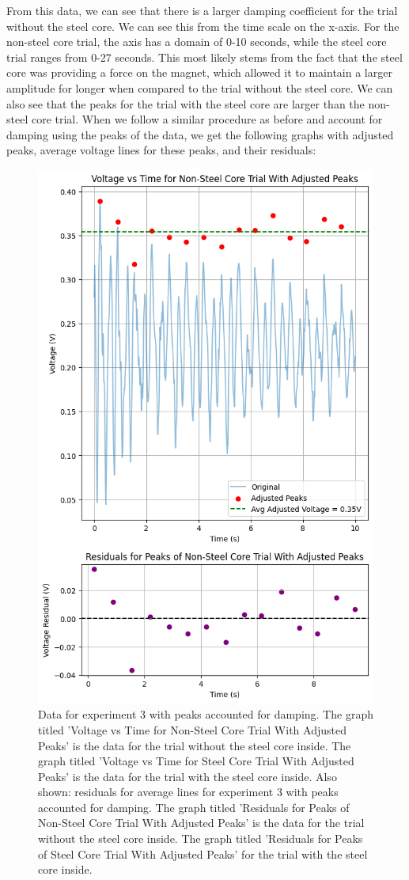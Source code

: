 \documentclass[11pt]{article}
\begin{document}
    From this data, we can see that there is a larger damping coefficient for the trial without the steel core. We can see this from the time scale on the x-axis. For the non-steel core trial, the axis has a domain of 0-10 seconds, while the steel core trial ranges from 0-27 seconds. This most likely stems from the fact that the steel core was providing a force on the magnet, which allowed it to maintain a larger amplitude for longer when compared to the trial without the steel core.
    We can also see that the peaks for the trial with the steel core are larger than the non-steel core trial. When we follow a similar procedure as before and account for damping using the peaks of the data, we get the following graphs with adjusted peaks, average voltage lines for these peaks, and their residuals:
    \begin{figure}[H]
        \centering
        \includegraphics[width=0.8\linewidth]{resources/images/part3 peaks1}
        \caption{Data for experiment 3 with peaks accounted for damping. The graph titled 'Voltage vs Time for Non-Steel Core Trial With Adjusted Peaks' is the data for the trial without the steel core inside. The graph titled 'Voltage vs Time for Steel Core Trial With Adjusted Peaks' is the data for the trial with the steel core inside. Also shown: residuals for average lines for experiment 3 with peaks accounted for damping. The graph titled 'Residuals for Peaks of Non-Steel Core Trial With Adjusted Peaks' is the data for the trial without the steel core inside. The graph titled 'Residuals for Peaks of Steel Core Trial With Adjusted Peaks' for the trial with the steel core inside.}
        \label{fig:part3_peaks}
    \end{figure}
\end{document}
